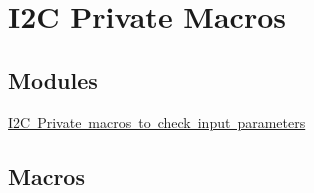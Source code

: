 \hypertarget{group___i2_c___private___macros}{}\section{I2C Private Macros}
\label{group___i2_c___private___macros}
\subsection*{Modules}
\begin{DoxyCompactItemize}
\item 
\mbox{\hyperlink{group___i2_c___i_s___r_t_c___definitions}{I2\+C Private macros to check input parameters}}
\end{DoxyCompactItemize}
\subsection*{Macros}
